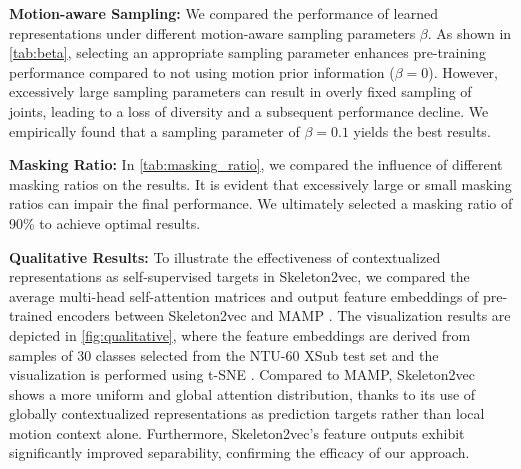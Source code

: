 \noindent \textbf{Motion-aware Sampling:}
We compared the performance of learned representations under different motion-aware
sampling parameters $\beta$. As shown in \cref{tab:beta}, selecting an appropriate
sampling parameter enhances pre-training performance compared to not using
motion prior information ($\beta=0$). However, excessively large sampling parameters
can result in overly fixed sampling of joints, leading to a loss of diversity and
a subsequent performance decline. We empirically found that a sampling parameter of
$\beta=0.1$ yields the best results.

\noindent \textbf{Masking Ratio:}
In \cref{tab:masking_ratio}, we compared the influence of different masking ratios
on the results. It is evident that excessively large or small masking ratios can
impair the final performance. We ultimately selected a masking ratio of 90\% to
achieve optimal results.

\noindent \textbf{Qualitative Results:}
To illustrate the effectiveness of contextualized representations as self-supervised targets
in Skeleton2vec, we compared the average multi-head self-attention matrices and
output feature embeddings of pre-trained encoders between Skeleton2vec and MAMP \cite{mao2023masked}.
The visualization results are
depicted in \cref{fig:qualitative}, where the feature embeddings are
derived from samples of 30 classes selected from the NTU-60 XSub test set
and the visualization is performed using t-SNE \cite{van2008visualizing}.
Compared to MAMP, Skeleton2vec shows a more uniform and global attention distribution,
thanks to its use of globally contextualized representations as prediction targets
rather than local motion context alone. Furthermore, Skeleton2vec's feature outputs exhibit
significantly improved separability, confirming the efficacy of our approach.